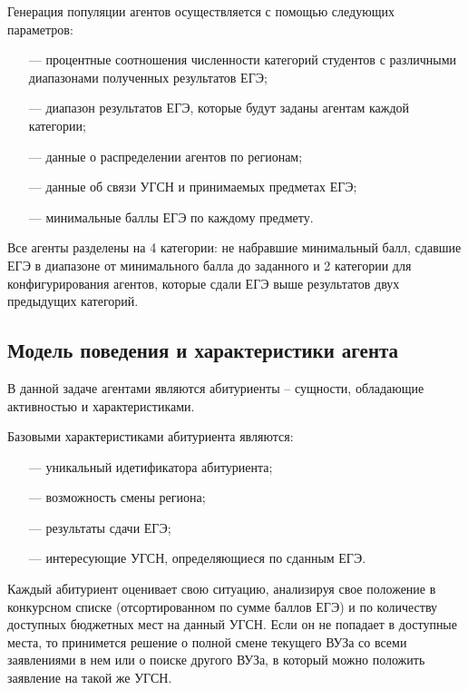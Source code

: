 Генерация популяции агентов осуществляется с помощью следующих параметров:

\begin{itemize}[leftmargin=1.6\parindent]
	\item[---] процентные соотношения численности категорий студентов с различными диапазонами полученных результатов ЕГЭ;
	\item[---] диапазон результатов ЕГЭ, которые будут заданы агентам каждой категории;
	\item[---] данные о распределении агентов по регионам;
	\item[---] данные об связи УГСН и принимаемых предметах ЕГЭ;
	\item[---] минимальные баллы ЕГЭ по каждому предмету.
\end{itemize}

Все агенты разделены на 4 категории: не набравшие минимальный балл, сдавшие ЕГЭ в диапазоне от минимального балла до заданного и 2 категории для конфигурирования агентов, которые сдали ЕГЭ выше результатов двух предыдущих категорий.



\subsection{Модель поведения и характеристики агента}

В данной задаче агентами являются абитуриенты – сущности, обладающие активностью и характеристиками.

Базовыми характеристиками абитуриента являются:

\begin{itemize}[leftmargin=1.6\parindent]
	\item[---] уникальный идетификатора абитуриента;
	\item[---] возможность смены региона;
	\item[---] результаты сдачи ЕГЭ;
	\item[---] интересующие УГСН, определяющиеся по сданным ЕГЭ.

\end{itemize}

Каждый абитуриент оценивает свою ситуацию, анализируя свое положение в конкурсном списке (отсортированном по сумме баллов ЕГЭ) и по количеству доступных бюджетных мест на данный УГСН. Если он не попадает в доступные места, то принимется решение о полной смене текущего ВУЗа со всеми заявлениями в нем или о поиске другого ВУЗа, в который можно положить заявление на такой же УГСН.

